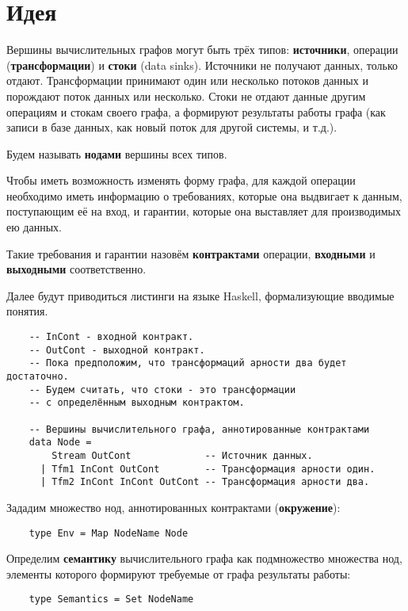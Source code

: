 \section{Идея}

Вершины вычислительных графов могут быть трёх типов: \textbf{источники}, операции (\textbf{трансформации}) и \textbf{стоки} (data sinks). Источники не получают данных, только отдают. Трансформации принимают один или несколько потоков данных и порождают поток данных или несколько. Стоки не отдают данные другим операциям и стокам своего графа, а формируют результаты работы графа (как записи в базе данных, как новый поток для другой системы, и т.д.).

Будем называть \textbf{нодами} вершины всех типов.

Чтобы иметь возможность изменять форму графа, для каждой операции необходимо иметь информацию о требованиях, которые она выдвигает к данным, поступающим её на вход, и гарантии, которые она выставляет для производимых ею данных.

Такие требования и гарантии назовём \textbf{контрактами} операции, \textbf{входными} и \textbf{выходными} соответственно.

Далее будут приводиться листинги на языке Haskell, формализующие вводимые понятия.

\begin{lstlisting}
    -- InCont - входной контракт.
    -- OutCont - выходной контракт.
    -- Пока предположим, что трансформаций арности два будет достаточно.
    -- Будем считать, что стоки - это трансформации
    -- с определённым выходным контрактом.

    -- Вершины вычислительного графа, аннотированные контрактами
    data Node =
        Stream OutCont             -- Источник данных.
      | Tfm1 InCont OutCont        -- Трансформация арности один.
      | Tfm2 InCont InCont OutCont -- Трансформация арности два.
\end{lstlisting}

Зададим множество нод, аннотированных контрактами (\textbf{окружение}):
\begin{lstlisting}
    type Env = Map NodeName Node
\end{lstlisting}

Определим \textbf{семантику} вычислительного графа как подмножество множества нод, элементы которого формируют требуемые от графа результаты работы:
\begin{lstlisting}
    type Semantics = Set NodeName
\end{lstlisting}

